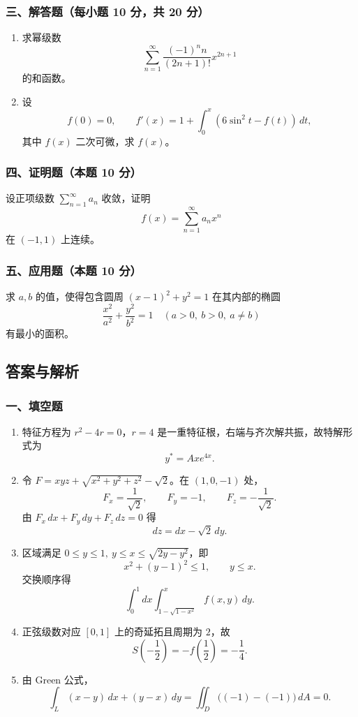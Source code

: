 \subsubsection*{三、解答题（每小题 10 分，共 20 分）}
\begin{enumerate}
  \item 求幂级数
  \[
  \sum_{n=1}^{\infty}\frac{(-1)^n n}{(2n+1)!}x^{2n+1}
  \]
  的和函数。
  \item 设
  \[
  f(0)=0,\qquad f'(x)=1+\int_0^x(6\sin^2t-f(t))\,dt,
  \]
  其中 $f(x)$ 二次可微，求 $f(x)$。
\end{enumerate}

\subsubsection*{四、证明题（本题 10 分）}
设正项级数 $\sum_{n=1}^{\infty}a_n$ 收敛，证明
\[
f(x)=\sum_{n=1}^{\infty}a_nx^n
\]
在 $(-1,1)$ 上连续。

\subsubsection*{五、应用题（本题 10 分）}
求 $a,b$ 的值，使得包含圆周 $(x-1)^2+y^2=1$ 在其内部的椭圆
\[
\frac{x^2}{a^2}+\frac{y^2}{b^2}=1\quad(a>0,\ b>0,\ a\ne b)
\]
有最小的面积。

\subsection{答案与解析}

\subsubsection*{一、填空题}
\begin{enumerate}
  \item 特征方程为 $r^2-4r=0$，$r=4$ 是一重特征根，右端与齐次解共振，故特解形式为
  \[
  y^*=Axe^{4x}.
  \]
  \item 令 $F=xyz+\sqrt{x^2+y^2+z^2}-\sqrt2$。在 $(1,0,-1)$ 处，
  \[
  F_x=\frac1{\sqrt2},\qquad F_y=-1,\qquad F_z=-\frac1{\sqrt2}.
  \]
  由 $F_x\,dx+F_y\,dy+F_z\,dz=0$ 得
  \[
  dz=dx-\sqrt2\,dy.
  \]
  \item 区域满足 $0\le y\le1,\ y\le x\le\sqrt{2y-y^2}$，即
  \[
  x^2+(y-1)^2\le1,\qquad y\le x.
  \]
  交换顺序得
  \[
  \int_0^1dx\int_{1-\sqrt{1-x^2}}^x f(x,y)\,dy.
  \]
  \item 正弦级数对应 $[0,1]$ 上的奇延拓且周期为 $2$，故
  \[
  S\!\left(-\frac12\right)=-f\!\left(\frac12\right)=-\frac14.
  \]
  \item 由 Green 公式，
  \[
  \int_L(x-y)\,dx+(y-x)\,dy
  =\iint_D\bigl((-1)-(-1)\bigr)\,dA=0.
  \]
\end{enumerate}

